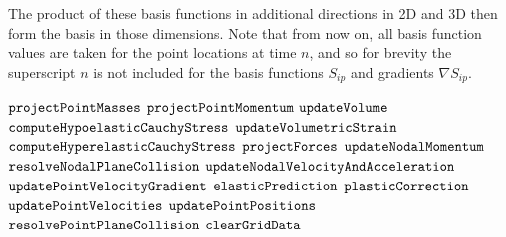 The product of these basis functions in additional directions in 2D and 3D then form the basis in those dimensions. Note that from now on, all basis function values are taken for the point locations at time $n$, and so for brevity the superscript $n$ is not included for the basis functions $S_{ip}$ and gradients $\nabla S_{ip}$.

\begin{algorithm}
  \caption{${\tt Overall \_ MPM \_ Algorithm}$}
  \begin{algorithmic}[1]
  \State ${\tt projectPointMasses}$
  \State ${\tt projectPointMomentum}$
  	\State ${\tt updateVolume}$
	\State ${\tt computeHypoelasticCauchyStress}$
  	\State ${\tt updateVolumetricStrain}$
	\State ${\tt computeHyperelasticCauchyStress}$ 
  \EndIf
  \State ${\tt projectForces}$ 
  \State ${\tt updateNodalMomentum}$
  \State ${\tt resolveNodalPlaneCollision}$
  \State ${\tt updateNodalVelocityAndAcceleration}$
  \State ${\tt updatePointVelocityGradient}$
  	\State ${\tt elasticPrediction}$
	\State ${\tt plasticCorrection}$
  \EndIf
  \State ${\tt updatePointVelocities}$
  \State ${\tt updatePointPositions}$
  \State ${\tt resolvePointPlaneCollision}$
  \State ${\tt clearGridData}$
  \end{algorithmic}
  \label{alg:MPM_algorithm}
\end{algorithm}


